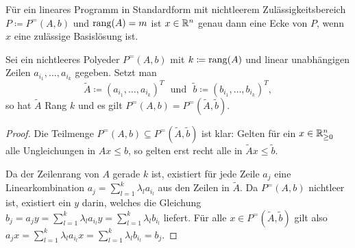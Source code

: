 \begin{satz}\label{satz-ecke-basislsg}
Für ein lineares Programm in Standardform mit nichtleerem Zulässigkeitsbereich $P\coloneq P^=(A,b)$ und $\operatorname{rang}(A) = m$ ist $x\in\mathbb{R}^n$ genau dann eine Ecke von $P$, wenn $x$ eine zulässige Basislösung ist.
\end{satz}

\begin{proposition}\label{prop-rank-obda-m}
	Sei ein nichtleeres Polyeder $P^=(A, b)$ mit $k\coloneq \operatorname{rang}(A)$ und linear unabhängigen Zeilen $a_{i_1},\dots, a_{i_k}$ gegeben.
	Setzt man \[
	\tilde{A}\coloneq (a_{i_1}, \dots, a_{i_k})^T\text{~ und ~}\tilde{b}\coloneq (b_{i_1}, \dots, b_{i_k})^T, \]
	 so hat $\tilde{A}$ Rang $k$ und es gilt $P^=(A,b) = P^=(\tilde{A}, \tilde{b})$.
\end{proposition}
\begin{proof}
	Die Teilmenge $P^=(A,b)\subseteq P^=(\tilde{A}, \tilde{b})$ ist klar:
	Gelten für ein $x\in\mathbb{R}^n_{\geq0}$ alle Ungleichungen in $Ax \leq b$, so gelten erst recht alle in $\tilde{A}x \leq \tilde{b}$.
	
	Da der Zeilenrang von $A$ gerade $k$ ist, existiert für jede Zeile $a_j$ eine Linearkombination $a_j=\sum_{l=1}^k \lambda_l a_{i_l}$ aus den Zeilen in $\tilde{A}$.
	Da $P^=(A,b)$ nichtleer ist, existiert ein $y$ darin, welches die Gleichung
	$b_j = a_j y = \sum_{l=1}^k \lambda_l a_{i_l} y = \sum_{l=1}^k \lambda_l b_{i_l}$ liefert.
	Für alle $x\in P^=(\tilde{A}, \tilde{b})$ gilt also $a_j x = \sum_{l=1}^k \lambda_l a_{i_l} x = \sum_{l=1}^k \lambda_l b_{i_l} = b_j$.
\end{proof}

